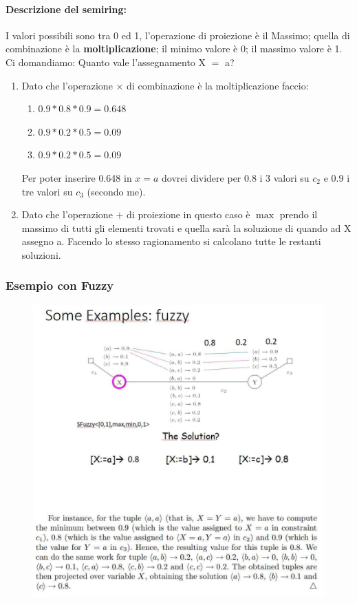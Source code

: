 \paragraph{Descrizione del semiring:} I valori possibili sono tra 0 ed 1,
l'operazione di proiezione è il Massimo; quella di combinazione è la
\textbf{moltiplicazione}; il minimo valore è 0; il massimo valore è 1. \\Ci
domandiamo: Quanto vale l'assegnamento X $=$ a?
\begin{enumerate}
    \item Dato che l'operazione $\times$ di combinazione è la moltiplicazione faccio:
          \begin{enumerate}
              \item $0.9*0.8*0.9 = 0.648$
              \item $0.9*0.2*0.5 = 0.09$
              \item $0.9*0.2*0.5 = 0.09$
          \end{enumerate}
          Per poter inserire 0.648 in $x = a$ dovrei dividere per 0.8 i 3 valori
          su $c_2$ e 0.9 i tre valori su $c_3$ (secondo me).
    \item Dato che l'operazione $+$ di proiezione in questo caso è $\max$ prendo il
          massimo di tutti gli elementi trovati e quella sarà la soluzione di
          quando ad X assegno a. Facendo lo stesso ragionamento si calcolano
          tutte le restanti soluzioni.
\end{enumerate}

\subsubsection{Esempio con Fuzzy}
\begin{figure}[H]
    \centering
    \includegraphics[width=12.5cm, keepaspectratio]{img/Cap4/fuzzy.png}
\end{figure}

